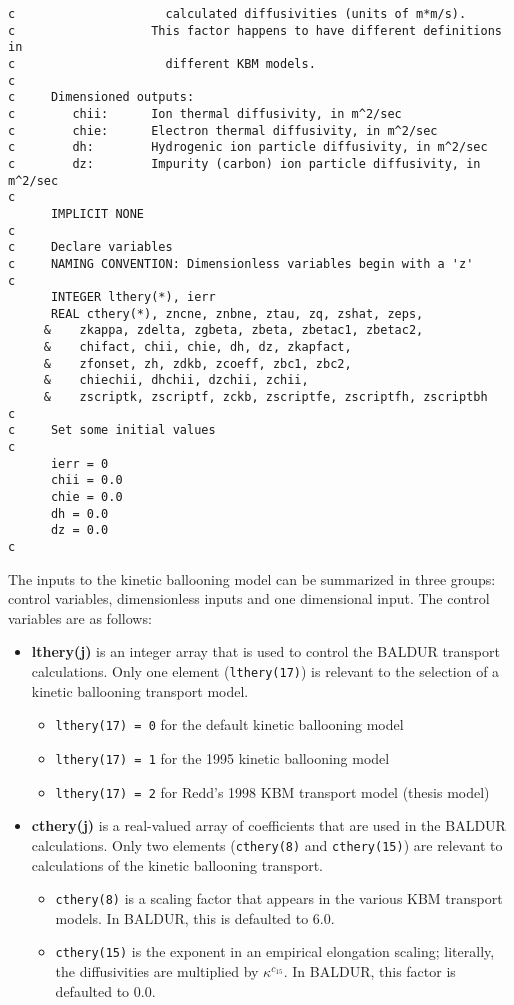 \begin{verbatim}
c                     calculated diffusivities (units of m*m/s).
c                   This factor happens to have different definitions in
c                     different KBM models.
c
c     Dimensioned outputs:
c        chii:      Ion thermal diffusivity, in m^2/sec
c        chie:      Electron thermal diffusivity, in m^2/sec
c        dh:        Hydrogenic ion particle diffusivity, in m^2/sec
c        dz:        Impurity (carbon) ion particle diffusivity, in m^2/sec
c
      IMPLICIT NONE
c
c     Declare variables
c     NAMING CONVENTION: Dimensionless variables begin with a 'z'
c
      INTEGER lthery(*), ierr
      REAL cthery(*), zncne, znbne, ztau, zq, zshat, zeps,
     &    zkappa, zdelta, zgbeta, zbeta, zbetac1, zbetac2,
     &    chifact, chii, chie, dh, dz, zkapfact,
     &    zfonset, zh, zdkb, zcoeff, zbc1, zbc2,
     &    chiechii, dhchii, dzchii, zchii,
     &    zscriptk, zscriptf, zckb, zscriptfe, zscriptfh, zscriptbh
c
c     Set some initial values
c
      ierr = 0
      chii = 0.0
      chie = 0.0
      dh = 0.0
      dz = 0.0
c
\end{verbatim}

The inputs to the kinetic ballooning model can be summarized in three groups:
control variables, dimensionless inputs and one dimensional input.
The control variables are as follows:
\begin{itemize}
\itemsep 0pt
\item {\bf lthery(j)} is an integer array that is used to control the
BALDUR transport calculations.  Only one element ({\tt lthery(17)}) is
relevant to the selection of a kinetic ballooning transport model.
\begin{itemize}
\itemsep 0pt
\item {\tt lthery(17) = 0} for the default kinetic ballooning model
\item {\tt lthery(17) = 1} for the 1995 kinetic ballooning model
\item {\tt lthery(17) = 2} for Redd's 1998 KBM transport model
(thesis model\cite{reddthes})
\end{itemize}
\item {\bf cthery(j)} is a real-valued array of coefficients that are used
in the BALDUR calculations.  Only two elements ({\tt cthery(8)} and
{\tt cthery(15)}) are relevant to calculations of the kinetic ballooning
transport.
\begin{itemize}
\itemsep 0pt
\item {\tt cthery(8)} is a scaling factor that appears in the various
KBM transport models.  In BALDUR, this is defaulted to 6.0.
\item {\tt cthery(15)} is the exponent in an empirical elongation scaling;
literally, the diffusivities are multiplied by $\kappa^{c_{15}}$.
In BALDUR, this factor is defaulted to 0.0.
\end{itemize}
\end{itemize}

